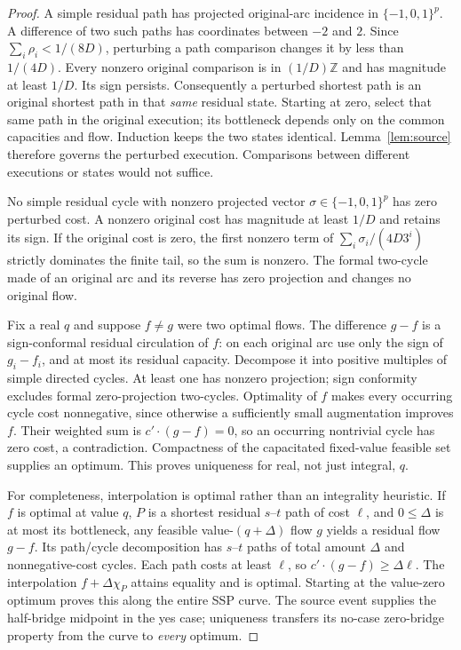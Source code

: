 \documentclass[11pt]{article}
\theoremstyle{remark}\newtheorem{remark}[theorem]{Remark}
\begin{document}
\begin{proof}
A simple residual path has projected original-arc incidence in $\{-1,0,1\}^p$. A difference of two such paths has coordinates between $-2$ and $2$. Since $\sum_i\rho_i<1/(8D)$, perturbing a path comparison changes it by less than $1/(4D)$. Every nonzero original comparison is in $(1/D)\mathbb Z$ and has magnitude at least $1/D$. Its sign persists. Consequently a perturbed shortest path is an original shortest path in that \emph{same} residual state. Starting at zero, select that same path in the original execution; its bottleneck depends only on the common capacities and flow. Induction keeps the two states identical. Lemma~\ref{lem:source} therefore governs the perturbed execution. Comparisons between different executions or states would not suffice.

No simple residual cycle with nonzero projected vector $\sigma\in\{-1,0,1\}^p$ has zero perturbed cost. A nonzero original cost has magnitude at least $1/D$ and retains its sign. If the original cost is zero, the first nonzero term of $\sum_i\sigma_i/(4D3^i)$ strictly dominates the finite tail, so the sum is nonzero. The formal two-cycle made of an original arc and its reverse has zero projection and changes no original flow.

Fix a real $q$ and suppose $f\ne g$ were two optimal flows. The difference $g-f$ is a sign-conformal residual circulation of $f$: on each original arc use only the sign of $g_i-f_i$, and at most its residual capacity. Decompose it into positive multiples of simple directed cycles. At least one has nonzero projection; sign conformity excludes formal zero-projection two-cycles. Optimality of $f$ makes every occurring cycle cost nonnegative, since otherwise a sufficiently small augmentation improves $f$. Their weighted sum is $c'\cdot(g-f)=0$, so an occurring nontrivial cycle has zero cost, a contradiction. Compactness of the capacitated fixed-value feasible set supplies an optimum. This proves uniqueness for real, not just integral, $q$.

For completeness, interpolation is optimal rather than an integrality heuristic. If $f$ is optimal at value $q$, $P$ is a shortest residual $s$--$t$ path of cost $\ell$, and $0\le\Delta$ is at most its bottleneck, any feasible value-$(q+\Delta)$ flow $g$ yields a residual flow $g-f$. Its path/cycle decomposition has $s$--$t$ paths of total amount $\Delta$ and nonnegative-cost cycles. Each path costs at least $\ell$, so $c'\cdot(g-f)\ge\Delta\ell$. The interpolation $f+\Delta\chi_P$ attains equality and is optimal. Starting at the value-zero optimum proves this along the entire SSP curve. The source event supplies the half-bridge midpoint in the yes case; uniqueness transfers its no-case zero-bridge property from the curve to \emph{every} optimum.
\end{proof}
\end{document}
